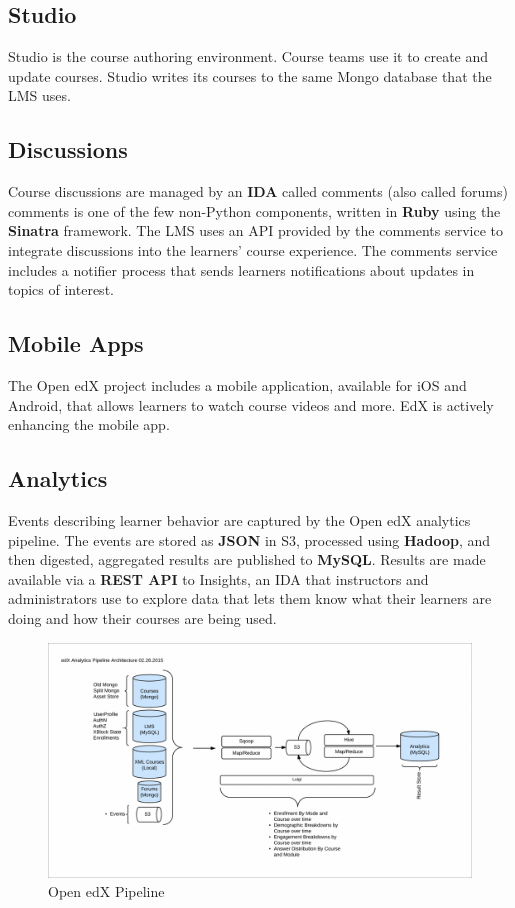 \subsection{Studio}
Studio is the course authoring environment. Course teams use it to create and update courses.
Studio writes its courses to the same Mongo database that the LMS uses.

\subsection{Discussions}
Course discussions are managed by an \textbf{IDA} called comments (also called forums) comments is one
of the few non-Python components, written in \textbf{Ruby} using the \textbf{Sinatra} framework. The LMS uses
an API provided by the comments service to integrate discussions into the learners’ course
experience.\newline
The comments service includes a notifier process that sends learners notifications about updates in
topics of interest.\newline

\subsection{Mobile Apps}
The Open edX project includes a mobile application, available for iOS and Android, that allows
learners to watch course videos and more. EdX is actively enhancing the mobile app.

\subsection{Analytics}
Events describing learner behavior are captured by the Open edX analytics pipeline. The events are
stored as \textbf{JSON} in S3, processed using \textbf{Hadoop}, and then digested, aggregated results are published
to \textbf{MySQL}. Results are made available via a \textbf{REST API} to Insights, an IDA that instructors and
administrators use to explore data that lets them know what their learners are doing and how their
courses are being used.

\begin{figure}
	\includegraphics[width=\linewidth]{images/edx_pipeline_0.png}
	\caption{Open edX Pipeline}
	\label{Fig.2:Open edX Pipeline}
\end{figure}

